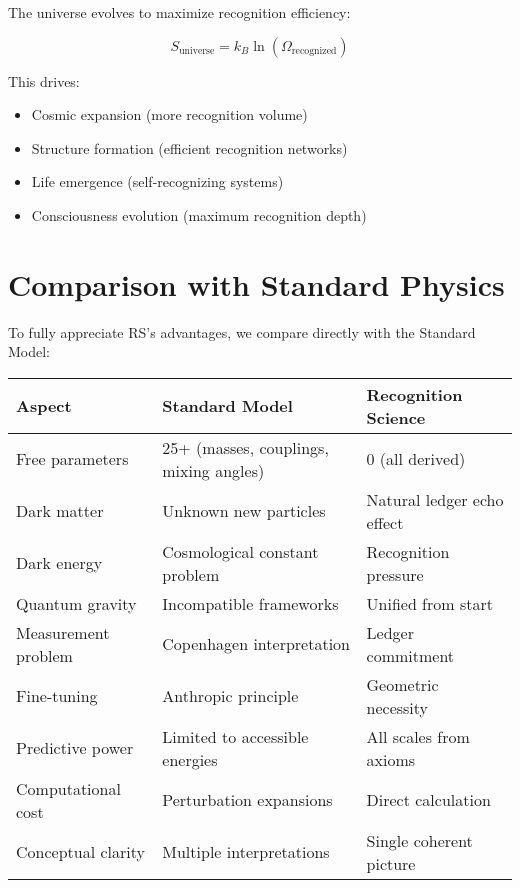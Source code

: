 \documentclass[12pt,a4paper]{article}
\theoremstyle{definition}
\begin{document}
The universe evolves to maximize recognition efficiency:

\begin{equation}
    S_{\text{universe}} = k_B \ln(\Omega_{\text{recognized}})
\end{equation}

This drives:
\begin{itemize}
    \item Cosmic expansion (more recognition volume)
    \item Structure formation (efficient recognition networks)
    \item Life emergence (self-recognizing systems)
    \item Consciousness evolution (maximum recognition depth)
\end{itemize}

\section{Comparison with Standard Physics}

To fully appreciate RS's advantages, we compare directly with the Standard Model:

\begin{center}
\begin{tabular}{p{3.5cm}p{5.5cm}p{5.5cm}}
\toprule
\textbf{Aspect} & \textbf{Standard Model} & \textbf{Recognition Science} \\
\midrule
Free parameters & 25+ (masses, couplings, mixing angles) & 0 (all derived) \\
Dark matter & Unknown new particles & Natural ledger echo effect \\
Dark energy & Cosmological constant problem & Recognition pressure \\
Quantum gravity & Incompatible frameworks & Unified from start \\
Measurement problem & Copenhagen interpretation & Ledger commitment \\
Fine-tuning & Anthropic principle & Geometric necessity \\
Predictive power & Limited to accessible energies & All scales from axioms \\
Computational cost & Perturbation expansions & Direct calculation \\
Conceptual clarity & Multiple interpretations & Single coherent picture \\
\bottomrule
\end{tabular}
\end{center}
\end{document}
